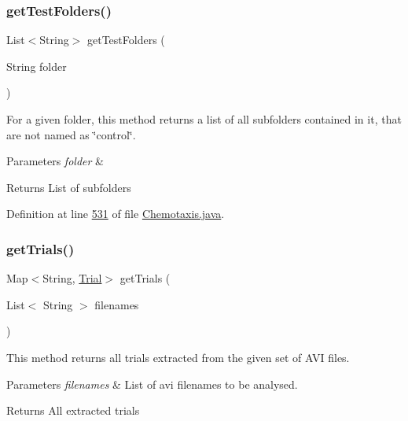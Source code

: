 \subsubsection{\texorpdfstring{get\+Test\+Folders()}{getTestFolders()}}
{\footnotesize\ttfamily List$<$String$>$ get\+Test\+Folders (\begin{DoxyParamCaption}\item[{String}]{folder }\end{DoxyParamCaption})\hspace{0.3cm}{\ttfamily [private]}}

For a given folder, this method returns a list of all subfolders contained in it, that are not named as \char`\"{}control\char`\"{}.


\begin{DoxyParams}{Parameters}
{\em folder} & \\
\hline
\end{DoxyParams}
\begin{DoxyReturn}{Returns}
List of subfolders 
\end{DoxyReturn}


Definition at line \hyperlink{_chemotaxis_8java_source_l00531}{531} of file \hyperlink{_chemotaxis_8java_source}{Chemotaxis.\+java}.

\hypertarget{classanalysis_1_1_chemotaxis_a5580224f7f7e9df7d925ad14f9364d98}{}\label{classanalysis_1_1_chemotaxis_a5580224f7f7e9df7d925ad14f9364d98} 
\subsubsection{\texorpdfstring{get\+Trials()}{getTrials()}}
{\footnotesize\ttfamily Map$<$String, \hyperlink{classdata_1_1_trial}{Trial}$>$ get\+Trials (\begin{DoxyParamCaption}\item[{List$<$ String $>$}]{filenames }\end{DoxyParamCaption})\hspace{0.3cm}{\ttfamily [private]}}

This method returns all trials extracted from the given set of A\+VI files.


\begin{DoxyParams}{Parameters}
{\em filenames} & List of avi filenames to be analysed. \\
\hline
\end{DoxyParams}
\begin{DoxyReturn}{Returns}
All extracted trials 
\end{DoxyReturn}


